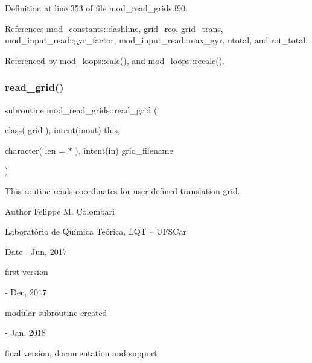Definition at line 353 of file mod\+\_\+read\+\_\+grids.\+f90.



References mod\+\_\+constants\+::dashline, grid\+\_\+reo, grid\+\_\+trans, mod\+\_\+input\+\_\+read\+::gyr\+\_\+factor, mod\+\_\+input\+\_\+read\+::max\+\_\+gyr, ntotal, and rot\+\_\+total.



Referenced by mod\+\_\+loops\+::calc(), and mod\+\_\+loops\+::recalc().

\mbox{\label{namespacemod__read__grids_aef0317c21ab86e2e970824fb37f613e7}} 
\subsubsection{\texorpdfstring{read\+\_\+grid()}{read\_grid()}}
{\footnotesize\ttfamily subroutine mod\+\_\+read\+\_\+grids\+::read\+\_\+grid (\begin{DoxyParamCaption}\item[{class( \hyperlink{structmod__read__grids_1_1grid}{grid} ), intent(inout)}]{this,  }\item[{character( len = $\ast$ ), intent(in)}]{grid\+\_\+filename }\end{DoxyParamCaption})}



This routine reads coordinates for user-\/defined translation grid. 

\begin{DoxyAuthor}{Author}
Felippe M. Colombari
\begin{DoxyItemize}
\item Laboratório de Química Teórica, L\+QT -- U\+F\+S\+Car 
\end{DoxyItemize}
\end{DoxyAuthor}
\begin{DoxyDate}{Date}
-\/ Jun, 2017
\begin{DoxyItemize}
\item first version 
\end{DoxyItemize}

-\/ Dec, 2017
\begin{DoxyItemize}
\item modular subroutine created 
\end{DoxyItemize}

-\/ Jan, 2018
\begin{DoxyItemize}
\item final version, documentation and support 
\end{DoxyItemize}
\end{DoxyDate}


